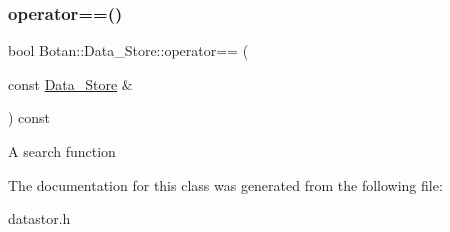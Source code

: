 \subsubsection{\texorpdfstring{operator==()}{operator==()}}
{\footnotesize\ttfamily bool Botan\+::\+Data\+\_\+\+Store\+::operator== (\begin{DoxyParamCaption}\item[{const \hyperlink{class_botan_1_1_data___store}{Data\+\_\+\+Store} \&}]{ }\end{DoxyParamCaption}) const}

A search function 

The documentation for this class was generated from the following file\+:\begin{DoxyCompactItemize}
\item 
datastor.\+h\end{DoxyCompactItemize}
